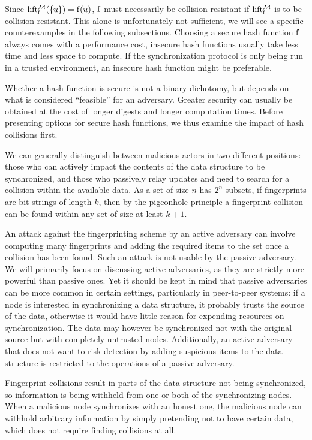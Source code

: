 Since $\operatorname{lift_{\operatorname{f}}^{\mathcal{M}}}(\{u\}) = \operatorname{f}(u)$, $\operatorname{f}$ must necessarily be collision resistant if $\operatorname{lift_{\operatorname{f}}^{\mathcal{M}}}$ is to be collision resistant. This alone is unfortunately not sufficient, we will see a specific counterexamples in the following subsections. Choosing a secure hash function $\operatorname{f}$ always comes with a performance cost, insecure hash functions usually take less time and less space to compute. If the synchronization protocol is only being run in a trusted environment, an insecure hash function might be preferable.

Whether a hash function is secure is not a binary dichotomy, but depends on what is considered ``feasible'' for an adversary. Greater security can usually be obtained at the cost of longer digests and longer computation times. Before presenting options for secure hash functions, we thus examine the impact of hash collisions first.

We can generally distinguish between malicious actors in two different positions: those who can actively impact the contents of the data structure to be synchronized, and those who passively relay updates and need to search for a collision within the available data. As a set of size $n$ has $2^n$ subsets, if fingerprints are bit strings of length $k$, then by the pigeonhole principle a fingerprint collision can be found within any set of size at least $k + 1$.

An attack against the fingerprinting scheme by an active adversary can involve computing many fingerprints and adding the required items to the set once a collision has been found. Such an attack is not usable by the passive adversary. We will primarily focus on discussing active adversaries, as they are strictly more powerful than passive ones. Yet it should be kept in mind that passive adversaries can be more common in certain settings, particularly in peer-to-peer systems: if a node is interested in synchronizing a data structure, it probably trusts the source of the data, otherwise it would have little reason for expending resources on synchronization. The data may however be synchronized not with the original source but with completely untrusted nodes. Additionally, an active adversary that does not want to risk detection by adding suspicious items to the data structure is restricted to the operations of a passive adversary.

Fingerprint collisions result in parts of the data structure not being synchronized, so information is being withheld from one or both of the synchronizing nodes. When a malicious node synchronizes with an honest one, the malicious node can withhold arbitrary information by simply pretending not to have certain data, which does not require finding collisions at all.

